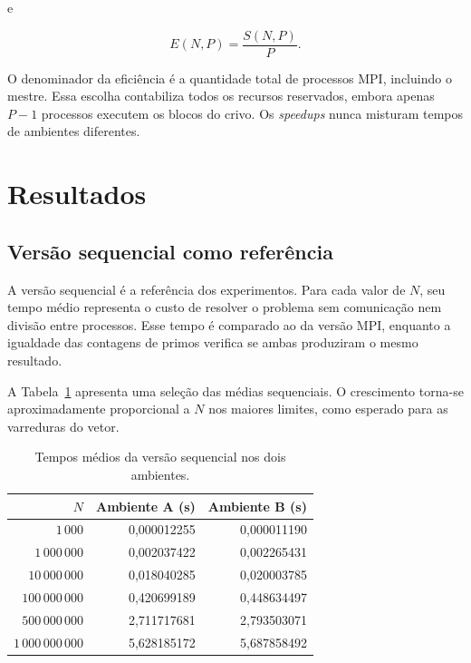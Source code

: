 \documentclass[12pt,a4paper]{article}
\begin{document}
e

\begin{equation}
    E(N,P)=\frac{S(N,P)}{P}.
\end{equation}

O denominador da eficiência é a quantidade total de processos MPI, incluindo
o mestre. Essa escolha contabiliza todos os recursos reservados, embora apenas
$P-1$ processos executem os blocos do crivo. Os \textit{speedups} nunca
misturam tempos de ambientes diferentes.

\section{Resultados}

\subsection{Versão sequencial como referência}

A versão sequencial é a referência dos experimentos. Para cada valor de $N$,
seu tempo médio representa o custo de resolver o problema sem comunicação nem
divisão entre processos. Esse tempo é comparado ao da versão MPI, enquanto a
igualdade das contagens de primos verifica se ambas produziram o mesmo
resultado.

A Tabela~\ref{tab:sequencial} apresenta uma seleção das médias sequenciais.
O crescimento torna-se aproximadamente proporcional a $N$ nos maiores
limites, como esperado para as varreduras do vetor.

\begin{table}[ht]
    \centering
    \caption{Tempos médios da versão sequencial nos dois ambientes.}
    \label{tab:sequencial}
    \begin{tabular}{rrr}
        \toprule
        \textbf{$N$} & \textbf{Ambiente A (s)} & \textbf{Ambiente B (s)} \\
        \midrule
        $1\,000$ & 0,000012255 & 0,000011190 \\
        $1\,000\,000$ & 0,002037422 & 0,002265431 \\
        $10\,000\,000$ & 0,018040285 & 0,020003785 \\
        $100\,000\,000$ & 0,420699189 & 0,448634497 \\
        $500\,000\,000$ & 2,711717681 & 2,793503071 \\
        $1\,000\,000\,000$ & 5,628185172 & 5,687858492 \\
        \bottomrule
    \end{tabular}
\end{table}
\end{document}
